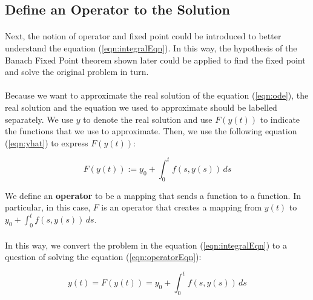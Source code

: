 \documentclass{article}
\theoremstyle{definition}
\theoremstyle{remark}
\theoremstyle{example}
\begin{document}
\subsection{Define an Operator to the Solution}\label{sec:3.2}

\paragraph{  }

Next, the notion of operator and fixed point could be introduced to better understand the equation (\ref{eqn:integralEqn}). In this way, the hypothesis of the Banach Fixed Point theorem shown later could be applied to find the fixed point and solve the original problem in turn.

\paragraph{  }

Because we want to approximate the real solution of the equation (\ref{eqn:ode}), the real solution and the equation we used to approximate should be labelled separately. We use $y$ to denote the real solution and use $F(y(t))$ to indicate the functions that we use to approximate. Then, we use the following equation (\ref{eqn:yhat}) to express $F(y(t))$:

\begin{equation}\label{eqn:yhat}
    F(y(t)) := y_0 + \int_{0}^{t}{f(s,y(s))}\,ds
\end{equation}

We define an \textbf{operator} to be a mapping that sends a function to a function. In particular, in this case, $F$ is an operator that creates a mapping from $y(t)$ to $y_0 + \int_{0}^{t}{f(s,y(s))}\,ds$.

\paragraph{  }

In this way, we convert the problem in the equation (\ref{eqn:integralEqn}) to a question of solving the equation (\ref{eqn:operatorEqn}):

\begin{equation}\label{eqn:operatorEqn}
    y(t) = F(y(t)) = y_0 + \int_{0}^{t}{f(s,y(s))}\,ds
\end{equation}

\paragraph{  }
\end{document}

